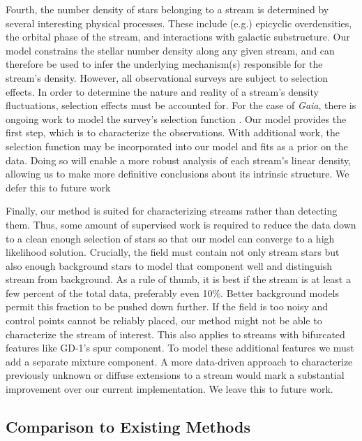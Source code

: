 \documentclass[twocolumn]{aastex631}
\newcommand{\dataarchive}[1]{\textit{#1}}
\newcommand{\Gaia}{\dataarchive{Gaia}}
\begin{document}
        Fourth, the number density of stars belonging to a stream is determined
        by several interesting physical processes. These include (e.g.)
        epicyclic overdensities, the orbital phase of the stream, and
        interactions with galactic substructure. Our model constrains the
        stellar number density along any given stream, and can therefore be used
        to infer the underlying mechanism(s) responsible for the stream’s
        density. However, all observational surveys are subject to selection
        effects. In order to determine the nature and reality of a stream’s
        density fluctuations, selection effects must be accounted for. For the
        case of \Gaia{}, there is ongoing work to model the survey’s selection
        function \citep{Cantat-Gaudin+2023}. Our model provides the first step,
        which is to characterize the observations.  With additional work, the
        selection function may be incorporated into our model and fits as a
        prior on the data.  Doing so will enable a more robust analysis of each
        stream's linear density, allowing us to make more definitive conclusions
        about its intrinsic structure. We defer this to future work
    
        Finally, our method is suited for characterizing streams rather than
        detecting them. Thus, some amount of supervised work is required to
        reduce the data down to a clean enough selection of stars so that our
        model can converge to a high likelihood solution. Crucially, the field
        must contain not only stream stars but also enough background stars to
        model that component well and distinguish stream from background. As a
        rule of thumb, it is best if the stream is at least a few percent of the
        total data, preferably even 10\%. Better background models permit this
        fraction to be pushed down further.  If the field is too noisy and
        control points cannot be reliably placed, our method might not be able
        to characterize the stream of interest.  This also applies to streams
        with bifurcated features like GD-1's spur component. To model these
        additional features we must add a separate mixture component. A more
        data-driven approach to characterize previously unknown or diffuse
        extensions to a stream would mark a substantial improvement over our
        current implementation. We leave this to future work.

    \subsection{Comparison to Existing Methods} \label{sub:comparison}
\end{document}
